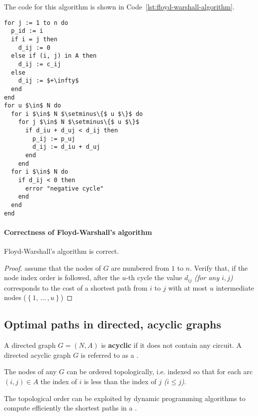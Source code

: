 \documentclass[english]{article}
\begin{document}
\bigskip
The code for this algorithm is shown in Code~\ref{lst:floyd-warshall-algorithm}.

\begin{lstlisting}[caption={Floyd-Warshall's algorithm}, label={lst:floyd-warshall-algorithm}, float]
for j := 1 to n do
  p_id := i
  if i = j then
    d_ij := 0
  else if (i, j) in A then
    d_ij := c_ij
  else
    d_ij := $+\infty$
  end
end
for u $\in$ N do
  for i $\in$ N $\setminus\{$ u $\}$ do
    for j $\in$ N $\setminus\{$ u $\}$
      if d_iu + d_uj < d_ij then
        p_ij := p_uj
        d_ij := d_iu + d_uj
      end
    end
  for i $\in$ N do
    if d_ij < 0 then
      error "negative cycle"
    end
  end
end
\end{lstlisting}

\paragraph{Correctness of Floyd-Warshall's algorithm}

\begin{proposition}
  Floyd-Warshall's algorithm is correct.
\end{proposition}

\begin{proof}
  assume that the nodes of \(G\) are numbered from \(1\) to \(n\).
  Verify that, if the node index order is followed, after the \(u\)-th cycle the value \(d_{ij}\) \textit{(for any \(i, j\))} corresponds to the cost of a shortest path from \(i\) to \(j\) with at most \(u\) intermediate nodes (\(\left\{ 1, \, \ldots \,, u \right\}\))
\end{proof}

\subsection{Optimal paths in directed, acyclic graphs}

A directed graph \(G = (N, A)\) is \textbf{acyclic} if it does not contain any circuit.
A directed acyclic graph \(G\) is referred to as a \DAG.

\begin{property}
  The nodes of any \DAG \(G\) can be ordered topologically, i.e. indexed so that for each arc \((i, j) \in A\) the index of \(i\) is less than the index of \(j\) \textit{(\(i \leq j\))}.
\end{property}

The topological order can be exploited by dynamic programming algorithms to compute efficiently the shortest paths in a \DAG.
\end{document}
